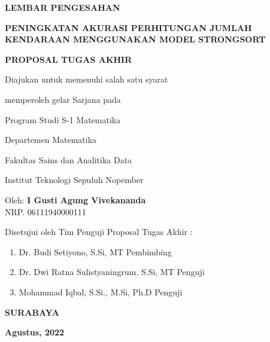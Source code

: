 \begin{center}
	\large
  \textbf{LEMBAR PENGESAHAN}
\end{center}
\vspace{2ex}
\thispagestyle{empty}

\begin{center}
  \MakeUppercase{\textbf{Peningkatan Akurasi Perhitungan Jumlah Kendaraan menggunakan model StrongSORT}}
\end{center}
\vspace{1ex}
\begingroup
  \small
\begin{spacing}{1.5}
  \begin{center}
   \MakeUppercase{\textbf{Proposal Tugas Akhir}}
   
   
   Diajukan untuk memenuhi salah satu syarat
   
   
   memperoleh gelar Sarjana pada
   
   
   Program Studi S-1 Matematika
   
   
   Departemen Matematika
   
   
   Fakultas Sains dan Analitika Data
   
   
   Institut Teknologi Sepuluh Nopember
  \end{center}
 
\vspace{3ex}
  \begin{center}
    Oleh: \textbf{I Gusti Agung Vivekananda} \\
    NRP. 06111940000111
  \end{center}

\vspace{2ex}
  \begin{center}
    Disetujui oleh Tim Penguji Proposal Tugas Akhir :
  \end{center}
  \vspace{2ex}
  \begingroup


    \noindent
   
     \begin{enumerate}
     \item Dr. Budi Setiyono, S.Si, MT  \hspace{60mm}  Pembimbing
     \item  Dr. Dwi Ratna Sulistyaningrum, S.Si, MT  \hspace{39mm} Penguji
     \item Mohammad Iqbal, S.Si., M.Si, Ph.D \hspace{48mm} Penguji
  \end{enumerate}
    
 
  \endgroup

\begin{center}
  \vspace{40ex}

 \MakeUppercase{\textbf{Surabaya}}
 
 
 \textbf{Agustus, 2022}

\end{center}
 \end{spacing}
\newpage